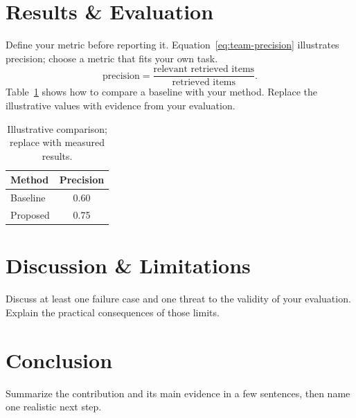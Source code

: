 \documentclass[../../proceedings/main.tex]{subfiles}
\begin{document}
\begin{refsection}
\section{Results \& Evaluation}
Define your metric before reporting it. Equation~\ref{eq:team-precision}
illustrates precision; choose a metric that fits your own task.
\begin{equation}
  \mathrm{precision}=\frac{\text{relevant retrieved items}}{\text{retrieved items}}.
  \label{eq:team-precision}
\end{equation}
Table~\ref{tab:team-results} shows how to compare a baseline with your method.
Replace the illustrative values with evidence from your evaluation.
\begin{table}[t]
  \centering
  \caption{Illustrative comparison; replace with measured results.}
  \label{tab:team-results}
  \begin{tabular}{lc}\toprule
    Method & Precision \\ \midrule
    Baseline & 0.60 \\
    Proposed & 0.75 \\ \bottomrule
  \end{tabular}
\end{table}

\section{Discussion \& Limitations}
Discuss at least one failure case and one threat to the validity of your
evaluation. Explain the practical consequences of those limits.

\section{Conclusion}
Summarize the contribution and its main evidence in a few sentences, then name
one realistic next step.

\printbibliography[heading=subbibliography,title={References}]
\end{refsection}
\end{document}
